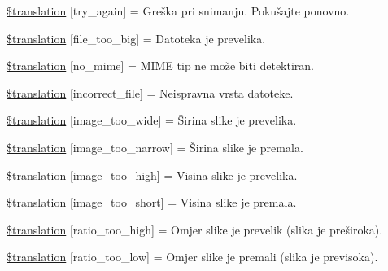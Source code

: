 \begin{DoxyCompactItemize}
\hyperlink{class_8upload_8hr___h_r_8php_a3afc377bd803683314f413a814243066}{\$translation} \mbox{[}\textquotesingle{}try\+\_\+again\textquotesingle{}\mbox{]} = \textquotesingle{}Greška pri snimanju. Pokušajte ponovno.\textquotesingle{}
\item 
\hyperlink{class_8upload_8hr___h_r_8php_a476278eb4a0c3df56af068e2d511a741}{\$translation} \mbox{[}\textquotesingle{}file\+\_\+too\+\_\+big\textquotesingle{}\mbox{]} = \textquotesingle{}Datoteka je prevelika.\textquotesingle{}
\item 
\hyperlink{class_8upload_8hr___h_r_8php_a191a55df8e3bb7f3c51b70f3c1932e02}{\$translation} \mbox{[}\textquotesingle{}no\+\_\+mime\textquotesingle{}\mbox{]} = \textquotesingle{}M\+I\+M\+E tip ne može biti detektiran.\textquotesingle{}
\item 
\hyperlink{class_8upload_8hr___h_r_8php_a4d32343e2699edd6fd435f9c832cb9c7}{\$translation} \mbox{[}\textquotesingle{}incorrect\+\_\+file\textquotesingle{}\mbox{]} = \textquotesingle{}Neispravna vrsta datoteke.\textquotesingle{}
\item 
\hyperlink{class_8upload_8hr___h_r_8php_a0dd3e4930ca1f59ae280f4b1006525cd}{\$translation} \mbox{[}\textquotesingle{}image\+\_\+too\+\_\+wide\textquotesingle{}\mbox{]} = \textquotesingle{}Širina slike je prevelika.\textquotesingle{}
\item 
\hyperlink{class_8upload_8hr___h_r_8php_a5c9a4cd67fd21c32e0a3b434591a6037}{\$translation} \mbox{[}\textquotesingle{}image\+\_\+too\+\_\+narrow\textquotesingle{}\mbox{]} = \textquotesingle{}Širina slike je premala.\textquotesingle{}
\item 
\hyperlink{class_8upload_8hr___h_r_8php_aa27bde361343f3b63c7cd441860024f8}{\$translation} \mbox{[}\textquotesingle{}image\+\_\+too\+\_\+high\textquotesingle{}\mbox{]} = \textquotesingle{}Visina slike je prevelika.\textquotesingle{}
\item 
\hyperlink{class_8upload_8hr___h_r_8php_a86fcd4e1157b00032df451188d735527}{\$translation} \mbox{[}\textquotesingle{}image\+\_\+too\+\_\+short\textquotesingle{}\mbox{]} = \textquotesingle{}Visina slike je premala.\textquotesingle{}
\item 
\hyperlink{class_8upload_8hr___h_r_8php_a23396f6ce7f31e5e5f1b57580621d982}{\$translation} \mbox{[}\textquotesingle{}ratio\+\_\+too\+\_\+high\textquotesingle{}\mbox{]} = \textquotesingle{}Omjer slike je prevelik (slika je preširoka).\textquotesingle{}
\item 
\hyperlink{class_8upload_8hr___h_r_8php_ac533b9a479f056b0b8623e4268f068c2}{\$translation} \mbox{[}\textquotesingle{}ratio\+\_\+too\+\_\+low\textquotesingle{}\mbox{]} = \textquotesingle{}Omjer slike je premali (slika je previsoka).\textquotesingle{}

\end{DoxyCompactItemize}
